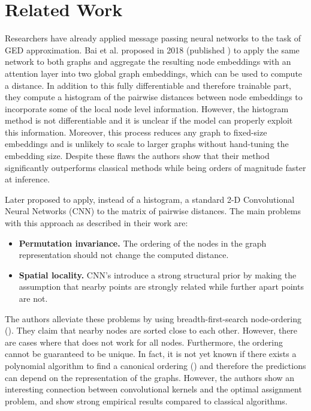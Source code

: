 \section{Related Work}

Researchers have already applied message passing neural networks to the task of GED approximation. Bai et al. proposed in 2018 (published \citealp{bai2019}) to apply the same network to both graphs and aggregate the resulting node embeddings with an attention layer into two global graph embeddings, which can be used to compute a distance. In addition to this fully differentiable and therefore trainable part, they compute a histogram of the pairwise distances between node embeddings to incorporate some of the local node level information. However, the histogram method is not differentiable and it is unclear if the model can properly exploit this information. Moreover, this process reduces any graph to fixed-size embeddings and is unlikely to scale to larger graphs without hand-tuning the embedding size. Despite these flaws the authors show that their method significantly outperforms classical methods while being orders of magnitude faster at inference.

Later \cite{bai2018_cnn1} proposed to apply, instead of a histogram, a standard 2-D Convolutional Neural Networks (CNN) to the matrix of pairwise distances. The main problems with this approach as described in their work are:
\begin{itemize}
     \itemsep0em
     \item \textbf{Permutation invariance.} The ordering of the nodes in the graph representation should not change the computed distance.
     \item \textbf{Spatial locality.} CNN's introduce a strong structural prior by making the assumption that nearby points are strongly related while further apart points are not.
\end{itemize}
The authors alleviate these problems by using breadth-first-search node-ordering (\citealp{bfs2018}). They claim that nearby nodes are sorted close to each other. However, there are cases where that does not work for all nodes. Furthermore, the ordering cannot be guaranteed to be unique. In fact, it is not yet known if there exists a polynomial algorithm to find a canonical ordering (\citealp{canonical2016}) and therefore the predictions can depend on the representation of the graphs. However, the authors show an interesting connection between convolutional kernels and the optimal assignment problem, and show strong empirical results compared to classical algorithms.

